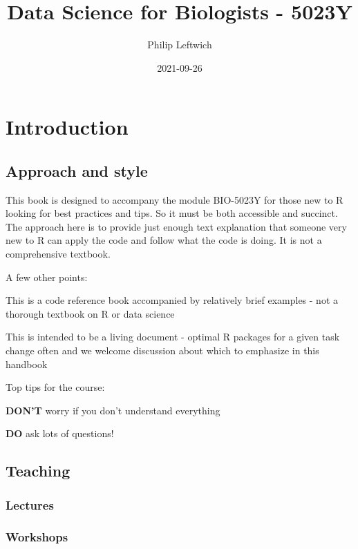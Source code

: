 \documentclass[
]{book}
\title{Data Science for Biologists - 5023Y}
\author{Philip Leftwich}
\date{2021-09-26}
\begin{document}
\maketitle

{
\setcounter{tocdepth}{1}
\tableofcontents
}
\hypertarget{introduction}{%
\chapter{Introduction}\label{introduction}}

\hypertarget{approach-and-style}{%
\section{Approach and style}\label{approach-and-style}}

This book is designed to accompany the module BIO-5023Y for those new to R looking for best practices and tips. So it must be both accessible and succinct. The approach here is to provide just enough text explanation that someone very new to R can apply the code and follow what the code is doing. It is not a comprehensive textbook.

A few other points:

This is a code reference book accompanied by relatively brief examples - not a thorough textbook on R or data science

This is intended to be a living document - optimal R packages for a given task change often and we welcome discussion about which to emphasize in this handbook

Top tips for the course:

\textbf{DON'T} worry if you don't understand everything

\textbf{DO} ask lots of questions!

\hypertarget{teaching}{%
\section{Teaching}\label{teaching}}

\hypertarget{lectures}{%
\subsection{Lectures}\label{lectures}}

\hypertarget{workshops}{%
\subsection{Workshops}\label{workshops}}
\end{document}

